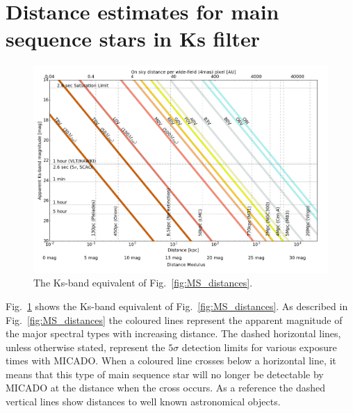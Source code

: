 \section{Distance estimates for main sequence stars in Ks filter}

\begin{figure}

    \centering
    \includegraphics[width=\textwidth]{images/spec_type_vs_dist_paper2_Ks}
    
    \caption{The Ks-band equivalent of Fig.~\ref{fig:MS_distances}.}
    
    \label{fig:MS_distances_Ks}
    
\end{figure}

Fig.~\ref{fig:MS_distances_Ks} shows the Ks-band equivalent of Fig.~\ref{fig:MS_distances}. As described in Fig.~\ref{fig:MS_distances} the coloured lines represent the apparent magnitude of the major spectral types with increasing distance. The dashed horizontal lines, unless otherwise stated, represent the $5\sigma$ detection limits for various exposure times with MICADO. When a coloured line crosses below a horizontal line, it means that this type of main sequence star will no longer be detectable by MICADO at the distance when the cross occurs. As a reference the dashed vertical lines show distances to well known astronomical objects.



